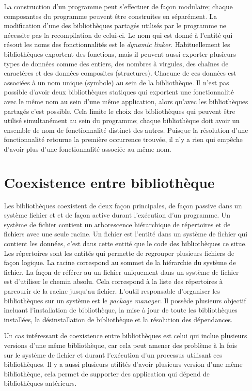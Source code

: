 \documentclass[12pt,initial,twoside,maitrise]{dms}
\numberwithin{equation}{section}
\numberwithin{table}{chapter}
\numberwithin{figure}{chapter}
\begin{document}
La construction d'un programme peut s'effectuer de façon modulaire; chaque
composantes du programme peuvent être construites en séparément.  La
modification d'une des bibliothèques partagés utilisés par
le programme ne nécessite pas la recompilation de celui-ci. Le nom qui est
donné à l'entité qui résout les noms des fonctionnalités est le \textit{dynamic linker}.
Habituellement les bibliothèques exportent des fonctions, mais il peuvent aussi
exporter plusieurs types de données comme des entiers, des nombres à virgules,
des chaînes de caractères et des données composites (structures). Chacune de ces données est
associées à un nom unique (symbole) au sein de la bibliothèque.
Il n'est pas possible d'avoir deux bibliothèques statiques qui exportent une
fonctionnalité avec le même nom au sein d'une même application, alors qu'avec
les bibliothèques partagés c'est possible. Cela limite le choix des
bibliothèques qui peuvent être utilisé simultanément au sein du programme;
chaque bibliothèque doit avoir un ensemble de nom de fonctionnalité distinct
des autres. Puisque la résolution d'une fonctionnalité retourne la première
occurrence trouvée, il n'y a rien qui empêche d'avoir plus d'une fonctionnalité
associée au même nom.

\section{Coexistence entre bibliothèque}
Les bibliothèques coexistent de deux façon principales, de façon passive dans
un système fichier et et de façon active durant l'exécution d'un programme.  Un
système de fichier contient un arborescence hiérarchique de répertoires et de
fichiers avec une seule racine. Un fichier est l'entité dans un système de
fichier qui contient les données, c'est dans cette entité que le code des
bibliothèques ce situe.  Les répertoires sont les entités qui permette de
regrouper plusieurs fichiers de façon logique. La racine correspond au sommet
de la hiérarchie du système de fichier. La façon de référer au un fichier
uniquement dans un système de fichier est d'utiliser le chemin absolu. Cela
correspond à la liste des répertoires à parcourir de la racine jusqu'au
fichier. L'outil responsable d'organiser les bibliothèques sur un système
est le \textit{package manager}. Il possède plusieurs objectif incluant
l'installation de bibliothèque, la mise à jour de toute les bibliothèques
installées, la désinstallation de bibliothèque et la résolution des dépendances.

Un cas intéressant de coexistence entre bibliothèques est celui qui inclue
plusieurs versions d'une même bibliothèque, car cela peut amener des problème
à la fois sur le système de fichier et durant l'exécution d'un processus utilisant
ces bibliothèques. Il y a aussi plusieurs utilités d'avoir plusieurs version
d'une même bibliothèque, cela permet de supporter des application qui dépend de
bibliothèques antérieurs.
\end{document}
